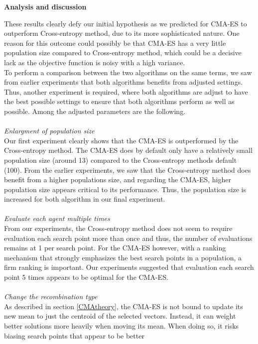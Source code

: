 \textbf{Analysis and discussion}

These results clearly defy our initial hypothesis as we predicted
for CMA-ES to outperform Cross-entropy method, due to its more sophisticated nature. 
One reason for this outcome could possibly be that
CMA-ES has a very little population size compared to Cross-entropy method,
which could be a decisive lack as the objective function is noisy with 
a high variance.\\

To perform a comparison between the two algorithms on the same terms,
we saw from earlier experiments that both algorithms benefits from 
adjusted settings. Thus, another experiment is required, where both algorithms
are adjust to have the best possible settings to ensure that both algorithms
perform as well as possible. Among the adjusted parameters are the following.\\
\\
\textit{Enlargment of population size}\\
Our first experiment clearly shows that the CMA-ES
is outperformed by the Cross-entropy method.
The CMA-ES does by default only have a relatively small
population size (around 13) compared to the Cross-entropy methods
default (100). From the earlier experiments, we saw that 
the Cross-entropy method does benefit from a higher populations size,
and regarding the CMA-ES, higher population size appears critical
to its performance. Thus, the population size is increased for 
both algorithm in our final experiment.\\
\\
\textit{Evaluate each agent multiple times}\\
From our experiments, the Cross-entropy method does not
seem to require evaluation each search point more than once
and thus, the number of evaluations remains at 1 per
search point. For the CMA-ES however, with a 
ranking mechanism that strongly emphasizes 
the best search points in a population, a firm
ranking is important. Our experiments suggested that
evaluation each search point 5 times appears to be optimal 
for the CMA-ES.\\
\\
\textit{Change the recombination type}\\
As described in section \ref{CMAtheory}, 
the CMA-ES is not bound to update its 
new mean to just the centroid of the selected 
vectors. Instead, it can weight better solutions
more heavily when moving its mean. When doing so,
it risks biasing search points that appear to be better 
